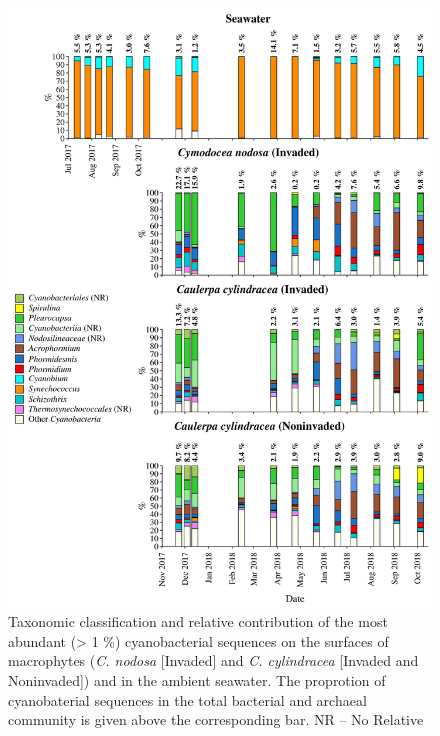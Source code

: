 \documentclass[12pt,]{article}
\begin{document}
\begin{figure}[H]

{\centering \includegraphics[width=0.85\linewidth]{../results/figures/cyanobacteria_bar_plot} 

}

\caption{Taxonomic classification and relative contribution of the most abundant (> 1 \si{\percent}) cyanobacterial sequences on the surfaces of macrophytes (\textit{C. nodosa} [Invaded] and \textit{C. cylindracea} [Invaded and Noninvaded]) and in the ambient seawater. The proprotion of cyanobaterial sequences in the total bacterial and archaeal community is given above the corresponding bar. NR -- No Relative\label{cyano}}\label{fig:unnamed-chunk-5}
\end{figure}
\end{document}
